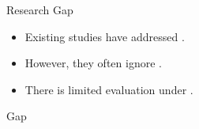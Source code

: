 \begin{frame}{Research Gap}

\begin{itemize}
    \item Existing studies have addressed .
    \item However, they often ignore .
    \item There is limited evaluation under .
\end{itemize}

\vspace{0.45cm}

\begin{block}{Gap}
\end{block}

\end{frame}
